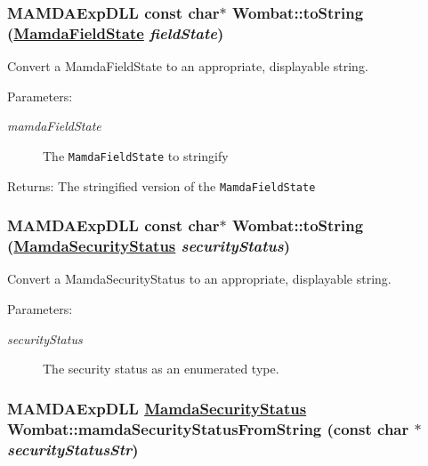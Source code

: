 \hypertarget{namespaceWombat_59b4d6cf9a01457bcb1d539cc26d3803}{
\subsubsection[toString]{\setlength{\rightskip}{0pt plus 5cm}MAMDAExp\-DLL const char$\ast$ Wombat::to\-String (\hyperlink{namespaceWombat_93aac974f2ab713554fd12a1fa3b7d2a}{Mamda\-Field\-State} {\em field\-State})}}
\label{namespaceWombat_59b4d6cf9a01457bcb1d539cc26d3803}


Convert a Mamda\-Field\-State to an appropriate, displayable string. 

\begin{Desc}
\item[Parameters:]
\begin{description}
\item[{\em mamda\-Field\-State}]The {\tt Mamda\-Field\-State} to stringify\end{description}
\end{Desc}
\begin{Desc}
\item[Returns:]The stringified version of the {\tt Mamda\-Field\-State} \end{Desc}
\hypertarget{namespaceWombat_3f6d8c7884a574324c63379d915be1c3}{
\subsubsection[toString]{\setlength{\rightskip}{0pt plus 5cm}MAMDAExp\-DLL const char$\ast$ Wombat::to\-String (\hyperlink{namespaceWombat_073e683b7aeffa26cf3d2791dda32b4b}{Mamda\-Security\-Status} {\em security\-Status})}}
\label{namespaceWombat_3f6d8c7884a574324c63379d915be1c3}


Convert a Mamda\-Security\-Status to an appropriate, displayable string. 

\begin{Desc}
\item[Parameters:]
\begin{description}
\item[{\em security\-Status}]The security status as an enumerated type. \end{description}
\end{Desc}
\hypertarget{namespaceWombat_6b90a072d040ebf093cb4d1c87218108}{
\subsubsection[mamdaSecurityStatusFromString]{\setlength{\rightskip}{0pt plus 5cm}MAMDAExp\-DLL \hyperlink{namespaceWombat_073e683b7aeffa26cf3d2791dda32b4b}{Mamda\-Security\-Status} Wombat::mamda\-Security\-Status\-From\-String (const char $\ast$ {\em security\-Status\-Str})}}
\label{namespaceWombat_6b90a072d040ebf093cb4d1c87218108}


